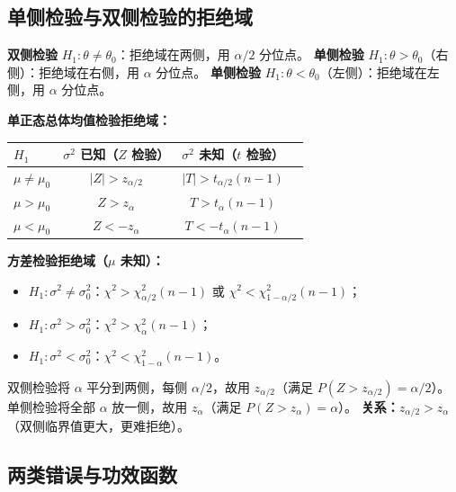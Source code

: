 \documentclass[11pt,a4paper]{article}
\begin{document}
\subsection{单侧检验与双侧检验的拒绝域}

\begin{variation}[拒绝域的确定规则]
\textbf{双侧检验} $H_1:\theta\neq\theta_0$：拒绝域在两侧，用 $\alpha/2$ 分位点。
\textbf{单侧检验} $H_1:\theta>\theta_0$（右侧）：拒绝域在右侧，用 $\alpha$ 分位点。
\textbf{单侧检验} $H_1:\theta<\theta_0$（左侧）：拒绝域在左侧，用 $\alpha$ 分位点。

\textbf{单正态总体均值检验拒绝域：}
\begin{center}
\begin{tabular}{lccc}
\toprule
$H_1$ & $\sigma^2$ 已知（$Z$ 检验） & $\sigma^2$ 未知（$t$ 检验） \\
\midrule
$\mu\neq\mu_0$ & $|Z|>z_{\alpha/2}$ & $|T|>t_{\alpha/2}(n-1)$ \\
$\mu>\mu_0$ & $Z>z_\alpha$ & $T>t_\alpha(n-1)$ \\
$\mu<\mu_0$ & $Z<-z_\alpha$ & $T<-t_\alpha(n-1)$ \\
\bottomrule
\end{tabular}
\end{center}

\textbf{方差检验拒绝域（$\mu$ 未知）：}
\begin{itemize}[leftmargin=2em]
  \item $H_1:\sigma^2\neq\sigma_0^2$：$\chi^2>\chi^2_{\alpha/2}(n-1)$ 或 $\chi^2<\chi^2_{1-\alpha/2}(n-1)$；
  \item $H_1:\sigma^2>\sigma_0^2$：$\chi^2>\chi^2_\alpha(n-1)$；
  \item $H_1:\sigma^2<\sigma_0^2$：$\chi^2<\chi^2_{1-\alpha}(n-1)$。
\end{itemize}
\end{variation}

\begin{derivation}[双侧与单侧分位点的关系]
双侧检验将 $\alpha$ 平分到两侧，每侧 $\alpha/2$，故用 $z_{\alpha/2}$（满足 $P(Z>z_{\alpha/2})=\alpha/2$）。
单侧检验将全部 $\alpha$ 放一侧，故用 $z_\alpha$（满足 $P(Z>z_\alpha)=\alpha$）。
\textbf{关系：}$z_{\alpha/2}>z_\alpha$（双侧临界值更大，更难拒绝）。
\end{derivation}

\subsection{两类错误与功效函数}
\end{document}
